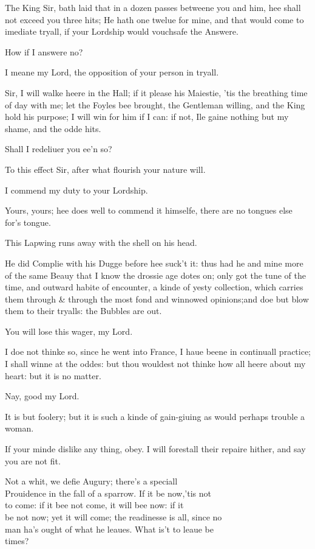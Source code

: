 \documentclass[a5paper,DIV=calc,11pt]{scrbook}
\begin{document}
\begin{drama*}
    \osrspeaks The King Sir, bath laid that in a dozen passes betweene you and him, hee shall not exceed you three hits; He hath one twelue for mine, and that would come to imediate tryall, if your Lordship would vouchsafe the Answere.
    
    \hamspeaks How if I answere no?
    
    \osrspeaks I meane my Lord, the opposition of your person in tryall.
    
    \hamspeaks Sir, I will walke heere in the Hall; if it please his Maiestie, 'tis the breathing time of day with me; let the Foyles bee brought, the Gentleman willing, and the King hold his purpose; I will win for him if I can: if not, Ile gaine nothing but my shame, and the odde hits.
    
    \osrspeaks Shall I redeliuer you ee'n so?
    
    \hamspeaks To this effect Sir, after what flourish your nature will.
    
    \osrspeaks I commend my duty to your Lordship.
    
    \hamspeaks Yours, yours; hee does well to commend it himselfe, there are no tongues else for's tongue.
    
    \horspeaks This Lapwing runs away with the shell on his head.
    
    \hamspeaks He did Complie with his Dugge before hee suck't it: thus had he and mine more of the same Beauy that I know the drossie age dotes on; only got the tune of the time, and outward habite of encounter, a kinde of yesty collection, which carries them through \& through the most fond and winnowed opinions;and doe but blow them to their tryalls: the Bubbles are out.
    
    \horspeaks You will lose this wager, my Lord.
    
    \hamspeaks I doe not thinke so, since he went into France, I haue beene in continuall practice; I shall winne at the oddes: but thou wouldest not thinke how all heere about my heart: but it is no matter.
    
    \horspeaks Nay, good my Lord.
    
    \hamspeaks It is but foolery; but it is such a kinde of gain-giuing as would perhaps trouble a woman.
    
    \horspeaks If your minde dislike any thing, obey. I will forestall their repaire hither, and say you are not fit.
    
    \hamspeaks Not a whit, we defie Augury; there's a speciall\\
    Prouidence in the fall of a sparrow. If it be now,'tis not\\
    to come: if it bee not come, it will bee now: if it\\
    be not now; yet it will come; the readinesse is all, since no\\
    man ha's ought of what he leaues. What is't to leaue be\\
    times?
    

\end{drama*}
\end{document}
